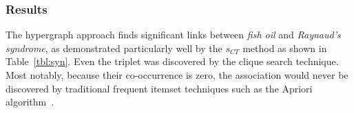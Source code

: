 
\subsubsection{Results}
The hypergraph approach finds significant links between \emph{fish oil} and \emph{Raynaud's syndrome}, as demonstrated particularly well by the $s_{CT}$ method as shown in Table~\ref{tbl:syn}. Even the triplet was discovered by the clique search technique.  Most notably, because their co-occurrence is zero, the association would never be discovered by traditional frequent itemset techniques such as the Apriori algorithm~\cite{apriori}.

